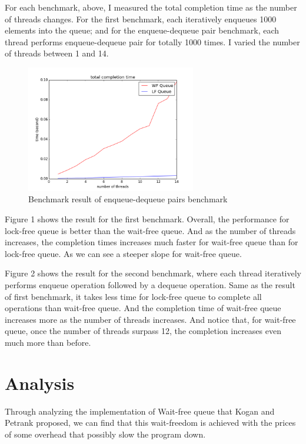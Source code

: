 \documentclass[a4paper]{article}
\begin{document}
For each benchmark, above, I measured the total completion time as the number of threads changes. For the first benchmark, each iteratively enqueues 1000 elements into the queue; and for the enqueue-dequeue pair benchmark, each thread performs enqueue-dequeue pair for totally 1000 times. I varied the number of threads between 1 and 14. 

\begin{figure}
\centering
\includegraphics[width=0.66\textwidth]{benchmark2.png}
\caption{\label{fig:benchmark2}Benchmark result of enqueue-dequeue pairs benchmark}
\end{figure}

Figure 1 shows the result for the first benchmark. Overall, the performance for lock-free queue is better than the wait-free queue. And as the number of threads increases, the completion times increases much faster for wait-free queue than for lock-free queue. As we can see a steeper slope for wait-free queue. 

Figure 2 shows the result for the second benchmark, where each thread iteratively performs enqueue operation followed by a dequeue operation. Same as the result of first benchmark, it takes less time for lock-free queue to complete all operations than wait-free queue. And the completion time of wait-free queue increases more as the number of threads increases. And notice that, for wait-free queue, once the number of threads surpass 12, the completion increases even much more than before. 

\section{Analysis}
Through analyzing the implementation of Wait-free queue that Kogan and Petrank proposed, we can find that this wait-freedom is achieved with the prices of some overhead that possibly slow the program down.
\end{document}
